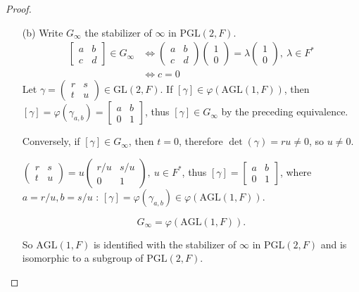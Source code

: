 \documentclass[11pt,a4paper]{article}
\begin{document}
\begin{proof}
\begin{enumerate}
\item[(b)]
Write $G_\infty$ the stabilizer of $\infty$ in $ \mathrm{PGL}(2,F)$.
\begin{align*}
\left[
\begin{array}{ccc}
 a &   b   \\
  c&   d     
\end{array}
\right]  \in G_\infty &\iff
\left(
\begin{array}{ccc}
 a &   b   \\
  c&   d      
\end{array}
\right)
\left(
\begin{array}{c}
  1    \\
  0      
\end{array}
\right)
= \lambda
\left(
\begin{array}{c}
  1    \\
  0      
\end{array}
\right),\  \lambda \in F^*
 \\
 &\iff c=0
\end{align*}
Let  $\gamma  = \left(
 \begin{array}{ccc}
 r &   s  \\
  t&   u      
\end{array}
\right)\in \mathrm{GL}(2,F)$. If  $[\gamma] \in \varphi(\mathrm{AGL}(1,F))$, then $[\gamma] =\varphi(\gamma_{a,b})= \left[
 \begin{array}{ccc}
 a&   b   \\
  0&   1      
\end{array}
\right]$, 
thus $[\gamma] \in G_\infty$ by the preceding equivalence.

Conversely, if $[\gamma] \in G_{\infty}$, then $t=0$, therefore $\det(\gamma) = ru \neq 0$, so $u \neq 0$.

$ 
\left(
\begin{array}{ccc}
 r &   s  \\
  t&   u      
\end{array}
\right) = u 
\left(
\begin{array}{ccc}
 r /u&   s/u  \\
  0&   1     
\end{array}
\right), \ u \in F^* 
$, thus $[\gamma] = 
\left[
 \begin{array}{ccc}
 a&   b   \\
  0&   1      
\end{array}
\right]$, where $a=r/u, b=s/u$ :
$[\gamma] = \varphi(\gamma_{a,b}) \in \varphi(\mathrm{AGL}(1,F))$.

$$G_\infty = \varphi( \mathrm{AGL}(1,F) ).$$

So $\mathrm{AGL}(1,F)$ is identified with the stabilizer of $\infty$ in $\mathrm{PGL}(2,F)$ and is isomorphic to a subgroup of $\mathrm{PGL}(2,F)$.
\end{enumerate}
\end{proof}
\end{document}
